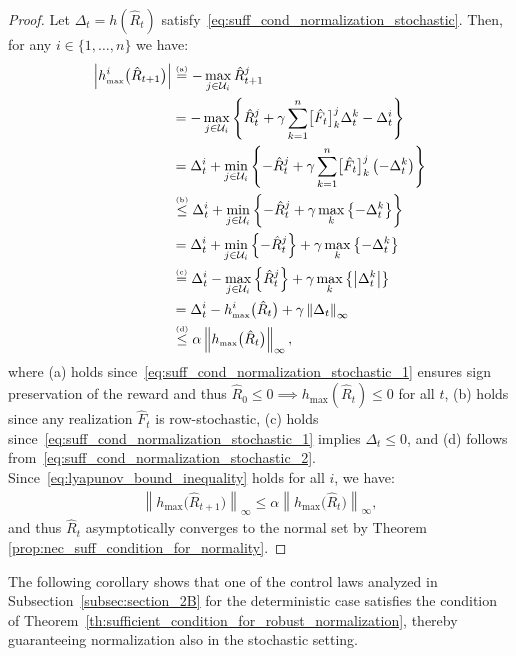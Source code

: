 \documentclass[10pt,leqno]{amsart}
\newcommand{\sml}{\scriptscriptstyle}
\newcommand{\stkrl}[2]{\stackrel{\text{\tiny{(#1)}}}{#2}}
\newcommand{\norm}[1]{\left \|#1 \right \|}
\newcommand{\U}{\mathcal{U}}
\newcommand{\Cost}{R}
\newcommand{\Fapx}{\hat{F}}
\newcommand{\disc}{\gamma}
\newcommand{\infnorm}[1]{\norm{#1}_\infty}
\newcommand{\outmap}{h_{\sml \text{max}}}
\newcommand{\Costpert}{\hat{\Cost}}
\begin{document}
\begin{proof}
    Let $\Delta_t = h(\Costpert_t)$ satisfy~\eqref{eq:suff_cond_normalization_stochastic}. Then, for any $i \in \{1, \hdots, n\}$ we have:
    \begin{align}
        \notag\left| \outmap^i\bigl(\Costpert_{t + 1}\bigr) \right| &\stkrl{a}{=} - \max_{j \in \U_i} \Costpert_{t+1}^j\\
        &\notag= - \max_{j \in \U_i}\left\{ \Costpert_t^j + \disc \sum_{k = 1}^n \bigl[\Fapx_t\bigr]_k^j \Delta_t^k - \Delta_t^i \right\}\\
        &\notag= \Delta_t^i + \min_{j \in \U_i} \left\{ - \Costpert_t^j + \disc \sum_{k = 1}^n \bigl[\Fapx_t\bigr]_k^j \left(-\Delta_t^k \right)\right\}\\
        &\notag\stkrl{b}{\leq} \Delta_t^i + \min_{j \in \U_i} \left\{ - \Costpert_t^j + \disc \max_k\left\{ -\Delta_t^k \right\}\right\}\\
        &\notag= \Delta_t^i + \min_{j \in \U_i} \left\{ - \Costpert_t^j \right\} + \disc \max_k\left\{ -\Delta_t^k \right\}\\
        &\notag\stkrl{c}{=} \Delta_t^i - \max_{j \in \U_i} \left\{ \Costpert_t^j \right\} + \disc \max_k\left\{ \bigl| \Delta_t^k \bigr| \right\}\\
        &\notag= \Delta_t^i - \outmap^i\bigl(\Costpert_t\bigr) + \disc \infnorm{\Delta_t}\\
        &\stkrl{d}{\leq} \alpha\infnorm{\outmap\bigl(\Costpert_t\bigr)},\label{eq:lyapunov_bound_inequality}
    \end{align}
    where (a) holds since~\eqref{eq:suff_cond_normalization_stochastic_1} ensures sign preservation of the reward and thus $\Costpert_0 \leq 0 \implies \outmap(\Costpert_t) \leq 0$ for all $t$, (b) holds since any realization $\Fapx_t$ is row-stochastic, (c) holds since~\eqref{eq:suff_cond_normalization_stochastic_1} implies $\Delta_t \leq 0$, and (d) follows from~\eqref{eq:suff_cond_normalization_stochastic_2}. Since~\eqref{eq:lyapunov_bound_inequality} holds for all $i$, we have:
    \begin{align}
        \infnorm{\outmap\bigl(\Costpert_{t + 1}\bigr)} \leq \alpha \infnorm{\outmap\bigl(\Costpert_{t}\bigr)},
    \end{align}
    and thus $\Costpert_t$ asymptotically converges to the normal set by Theorem \ref{prop:nec_suff_condition_for_normality}.
\end{proof}
\noindent The following corollary shows that one of the control laws analyzed in Subsection~\ref{subsec:section_2B} for the deterministic case satisfies the condition of Theorem~\ref{th:sufficient_condition_for_robust_normalization}, thereby guaranteeing normalization also in the stochastic setting.
\end{document}
